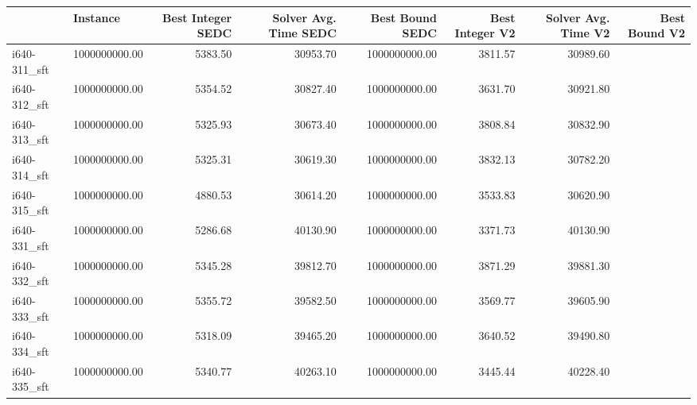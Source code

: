 \begin{tabular}{llrrrrrr}
\toprule
{} &      Instance &  Best Integer SEDC &  Solver Avg. Time SEDC &  Best Bound SEDC &  Best Integer V2 &  Solver Avg. Time V2 &  Best Bound V2 \\
\midrule
i640-311\_sft &      1000000000.00 &                5383.50 &         30953.70 &    1000000000.00 &              3811.57 &       30989.60 \\
i640-312\_sft &      1000000000.00 &                5354.52 &         30827.40 &    1000000000.00 &              3631.70 &       30921.80 \\
i640-313\_sft &      1000000000.00 &                5325.93 &         30673.40 &    1000000000.00 &              3808.84 &       30832.90 \\
i640-314\_sft &      1000000000.00 &                5325.31 &         30619.30 &    1000000000.00 &              3832.13 &       30782.20 \\
i640-315\_sft &      1000000000.00 &                4880.53 &         30614.20 &    1000000000.00 &              3533.83 &       30620.90 \\
i640-331\_sft &      1000000000.00 &                5286.68 &         40130.90 &    1000000000.00 &              3371.73 &       40130.90 \\
i640-332\_sft &      1000000000.00 &                5345.28 &         39812.70 &    1000000000.00 &              3871.29 &       39881.30 \\
i640-333\_sft &      1000000000.00 &                5355.72 &         39582.50 &    1000000000.00 &              3569.77 &       39605.90 \\
i640-334\_sft &      1000000000.00 &                5318.09 &         39465.20 &    1000000000.00 &              3640.52 &       39490.80 \\
i640-335\_sft &      1000000000.00 &                5340.77 &         40263.10 &    1000000000.00 &              3445.44 &       40228.40 \\
\bottomrule
\end{tabular}
